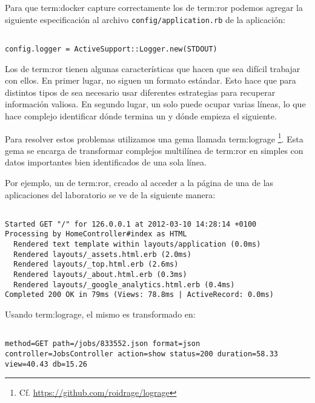 Para que \gls{term:docker} capture correctamente los  de \gls{term:ror}
podemos agregar la siguiente especificación al archivo
\texttt{config/application.rb} de la aplicación:

\begin{lstlisting}

config.logger = ActiveSupport::Logger.new(STDOUT)

\end{lstlisting}

Los  de \gls{term:ror} tienen algunas características que hacen que sea
difícil trabajar con ellos. En primer lugar, no siguen un formato estándar.
Esto hace que para distintos tipos de  sea necesario usar diferentes
estrategias para recuperar información valiosa. En segundo lugar, un solo
 puede ocupar varias líneas, lo que hace complejo identificar dónde termina
un  y dónde empieza el siguiente.

Para resolver estos problemas utilizamos una gema llamada \gls{term:lograge}
\footnote{Cf. \url{https://github.com/roidrage/lograge}}. Esta gema se encarga
de transformar complejos  multilínea de \gls{term:ror} en simples  con
datos importantes bien identificados de una sola línea.

Por ejemplo, un  de \gls{term:ror}, creado al acceder a la página 
de una de las aplicaciones del laboratorio se ve de la siguiente manera:

\begin{lstlisting}

Started GET "/" for 126.0.0.1 at 2012-03-10 14:28:14 +0100
Processing by HomeController#index as HTML
  Rendered text template within layouts/application (0.0ms)
  Rendered layouts/_assets.html.erb (2.0ms)
  Rendered layouts/_top.html.erb (2.6ms)
  Rendered layouts/_about.html.erb (0.3ms)
  Rendered layouts/_google_analytics.html.erb (0.4ms)
Completed 200 OK in 79ms (Views: 78.8ms | ActiveRecord: 0.0ms)

\end{lstlisting}

Usando \gls{term:lograge}, el mismo  es transformado en:

\begin{lstlisting}

method=GET path=/jobs/833552.json format=json controller=JobsController action=show status=200 duration=58.33 view=40.43 db=15.26

\end{lstlisting}

